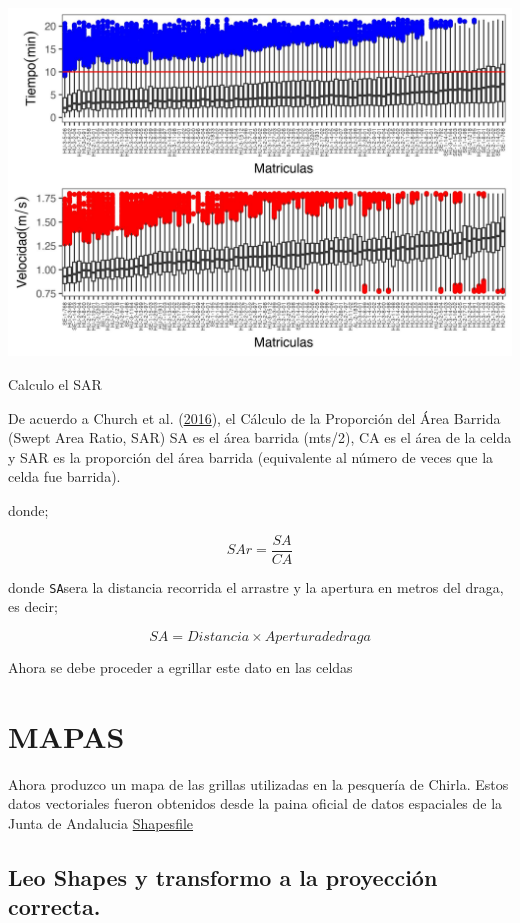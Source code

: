\documentclass[
]{article}
\begin{document}
\begin{center}\includegraphics{SAR_Method_files/figure-latex/unnamed-chunk-25-1} \end{center}

Calculo el SAR

De acuerdo a Church et al. (\protect\hyperlink{ref-Church2016}{2016}), el Cálculo de la Proporción del Área Barrida (Swept Area Ratio, SAR) SA es el área barrida (mts/2), CA es el área de la celda y SAR es la proporción del área barrida (equivalente al número de veces que la celda fue barrida).

donde;

\[
SAr = \frac{SA}{CA}
\]

donde \texttt{SA}sera la distancia recorrida el arrastre y la apertura en metros del draga, es decir;

\[
SA = Distancia \times Apertura de draga
\]

Ahora se debe proceder a egrillar este dato en las celdas

\hypertarget{mapas}{%
\section{MAPAS}\label{mapas}}

Ahora produzco un mapa de las grillas utilizadas en la pesquería de Chirla. Estos datos vectoriales fueron obtenidos desde la paina oficial de datos espaciales de la Junta de Andalucia \href{https://portalrediam.cica.es/descargas?path=\%2F08_AMBITOS_INTERES_AMBIENTAL\%2F02_LITORAL_MARINO\%2F04_SOCIOECONOMIA\%2FZonasProduccionMoluscos}{Shapesfile}

\hypertarget{leo-shapes-y-transformo-a-la-proyecciuxf3n-correcta.}{%
\subsection{Leo Shapes y transformo a la proyección correcta.}\label{leo-shapes-y-transformo-a-la-proyecciuxf3n-correcta.}}
\end{document}
